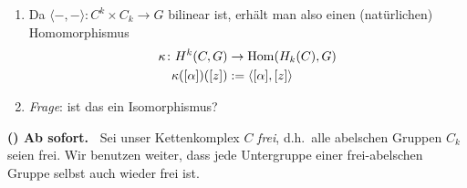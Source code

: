 \begin{kommentar}
  \begin{enumerate}
    \item
      Da $\langle - ,- \rangle \colon C^k \times C_k \to G$ bilinear ist, erhält man also einen (natürlichen) Homomorphismus
      \begin{align*}
        \kappa \colon H^k(C,G) & \to \mathrm{Hom}(H_k(C),G) \\
        \kappa ([\alpha])([z]) & := \langle [\alpha],[z] \rangle
      \end{align*}
    \item
      \emph{Frage}: ist das ein Isomorphismus?
  \end{enumerate}
\end{kommentar}
\textbf{(\theprop) Ab sofort.\ }
Sei unser Kettenkomplex $C$ \emph{frei}, d.h.\ alle abelschen Gruppen $C_k$ seien frei.
Wir benutzen weiter, dass jede Untergruppe einer frei-abelschen Gruppe selbst auch wieder frei ist.
